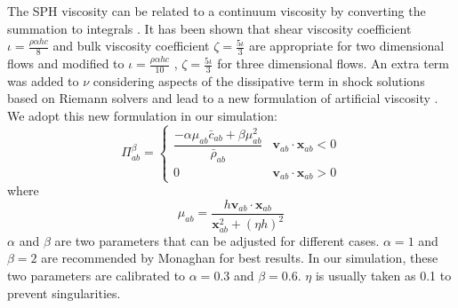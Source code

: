 The SPH viscosity can be related to a continuum viscosity by converting the summation to integrals \citep{monaghan2005smoothed}. It has been shown that shear viscosity coefficient $\iota= \frac{\rho \alpha h c}{8} $ and bulk viscosity coefficient $ \zeta = \frac{5 \iota}{3}$ are appropriate for two dimensional flows and modified to $\iota= \frac{\rho \alpha h c}{10} $ , $ \zeta = \frac{5 \iota}{3}$ for three dimensional flows.
An extra term was added to $\nu$ considering aspects of the dissipative term in shock solutions based on Riemann solvers and lead to a new formulation of artificial viscosity \citep{monaghan1992smoothed}. We adopt this new formulation in our simulation:
\begin{equation}
\Pi_{ab}^{\beta} = 
\begin{cases} 
      \dfrac{- \alpha \mu_{ab} \bar{c}_{ab} + \beta \mu_{ab}^2} {\bar{\rho}_{ab}} & \textbf{v}_{ab} \cdot \textbf{x}_{ab} < 0\\
      0 & \textbf{v}_{ab} \cdot \textbf{x}_{ab} > 0
\end{cases}
\label{eq:art-vis-shock}
\end{equation}
where
\begin{equation}
\mu_{ab} = \dfrac{h \textbf{v}_{ab} \cdot \textbf{x}_{ab}}{\textbf{x}_{ab}^2 + \left(\eta h\right)^2} 
\end{equation}
$\alpha$ and $\beta$ are two parameters that can be adjusted for different cases.
$\alpha = 1$ and $\beta = 2$ are  recommended by Monaghan for best results. In our simulation, these two parameters are calibrated to  $\alpha = 0.3$ and $\beta = 0.6$. $\eta$ is usually taken as 0.1 to prevent singularities.

